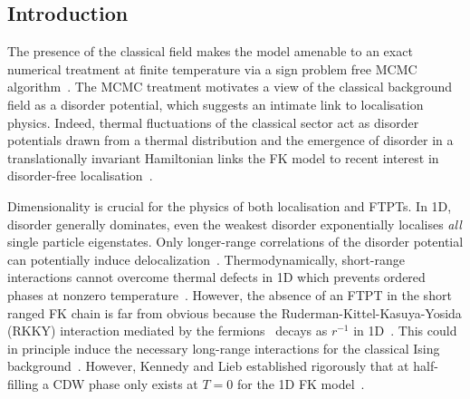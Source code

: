 \hypertarget{introduction}{%
\subsection{Introduction}\label{introduction}}

The presence of the classical field makes the model amenable to an exact numerical treatment at finite temperature via a sign problem free MCMC algorithm~\autocite{devriesGapsDensitiesStates1993,devriesSimplifiedHubbardModel1993,antipovInteractionTunedAndersonMott2016,debskiPossibilityDetectionFinite2016,herrmannSpreadingCorrelationsFalicovKimball2018,maskaThermodynamicsTwodimensionalFalicovKimball2006}. The MCMC treatment motivates a view of the classical background field as a disorder potential, which suggests an intimate link to localisation physics. Indeed, thermal fluctuations of the classical sector act as disorder potentials drawn from a thermal distribution and the emergence of disorder in a translationally invariant Hamiltonian links the FK model to recent interest in disorder-free localisation~\autocite{smithDisorderFreeLocalization2017,smithDynamicalLocalizationMathbbZ2018,brenesManyBodyLocalizationDynamics2018}.

Dimensionality is crucial for the physics of both localisation and FTPTs. In 1D, disorder generally dominates, even the weakest disorder exponentially localises \emph{all} single particle eigenstates. Only longer-range correlations of the disorder potential can potentially induce delocalization~\autocite{aubryAnalyticityBreakingAnderson1980,dassarmaLocalizationMobilityEdges1990,dunlapAbsenceLocalizationRandomdimer1990}. Thermodynamically, short-range interactions cannot overcome thermal defects in 1D which prevents ordered phases at nonzero temperature~\autocite{andersonAbsenceDiffusionCertain1958,goldshteinPurePointSpectrum1977,abrahamsScalingTheoryLocalization1979,kramerLocalizationTheoryExperiment1993}. However, the absence of an FTPT in the short ranged FK chain is far from obvious because the Ruderman-Kittel-Kasuya-Yosida (RKKY) interaction mediated by the fermions~\autocite{kasuyaTheoryMetallicFerro1956,rudermanIndirectExchangeCoupling1954,vanvleckNoteInteractionsSpins1962,yosidaMagneticPropertiesCuMn1957} decays as \(r^{-1}\) in 1D~\autocite{rusinCalculationRKKYRange2017}. This could in principle induce the necessary long-range interactions for the classical Ising background~\autocite{thoulessLongRangeOrderOneDimensional1969,peierlsIsingModelFerromagnetism1936}. However, Kennedy and Lieb established rigorously that at half-filling a CDW phase only exists at \(T = 0\) for the 1D FK model~\autocite{kennedyItinerantElectronModel1986}.

